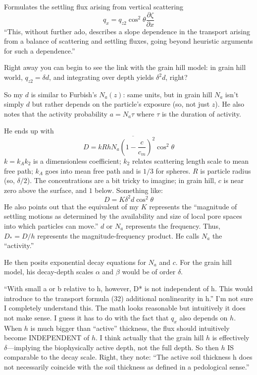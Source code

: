 \documentclass[12pt, oneside]{article}   	%
\begin{document}
Formulates the settling flux arising from vertical scattering
\begin{equation}
q_x = q_{z2} \cos^2\theta \frac{\partial \zeta}{\partial x}
\end{equation}
``This, without further ado, describes a slope dependence in the transport arising from a balance of scattering and settling fluxes, going beyond heuristic arguments for such a dependence.''

Right away you can begin to see the link with the grain hill model: in grain hill world, $q_{z2} = \delta d$, and integrating over depth yields $\delta^2 d$, right?

So my $d$ is similar to Furbish's $N_a(z)$: same units, but in grain hill $N_a$ isn't simply $d$ but rather depends on the particle's exposure (so, not just $z$). He also notes that the activity probability $a = N_a \tau$ where $\tau$ is the duration of activity.

He ends up with
\begin{equation}
D = k R h \overline{N_a \left( 1 - \frac{c}{c_m}\right)^2} \cos^2 \theta
\end{equation}
$k=k_A k_2$ is a dimensionless coefficient; $k_2$ relates scattering length scale to mean free path; $k_A$ goes into mean free path and is $1/3$ for spheres. $R$ is particle radius (so, $\delta /2$). The concentrations are a bit tricky to imagine; in grain hill, $c$ is near zero above the surface, and $1$ below. Something like:
\begin{equation}
D = K \delta^2 d \cos^2 \theta
\end{equation}
He also points out that the equivalent of my $K$ represents the ``magnitude of settling motions as determined by the availability and size of local pore spaces into which particles can move.'' $d$ or $N_a$ represents the frequency. Thus, $D_* = D/h$ represents the magnitude-frequency product. He calls $N_a$ the ``activity.''

He then posits exponential decay equations for $N_a$ and $c$. For the grain hill model, his decay-depth scales $\alpha$ and $\beta$ would be of order $\delta$.

``With small a or b relative to h, however, D* is not independent of h. This would introduce to the transport formula (32) additional nonlinearity in h.'' I'm not sure I completely understand this. The math looks reasonable but intuitively it does not make sense. I guess it has to do with the fact that $q_x$ also depends on $h$. When $h$ is much bigger than ``active'' thickness, the flux should intuitively become INDEPENDENT of $h$. I think actually that the grain hill $h$ is effectively $\delta$---implying the biophysically active depth, not the full depth. So then $h$ IS comparable to the decay scale. Right, they note: ``The active soil thickness h does not necessarily coincide with the soil thickness as defined in a pedological sense.''
\end{document}
